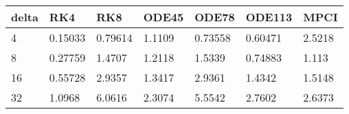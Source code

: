 \begin{tabular}{lllllll}
delta & RK4 & RK8 & ODE45 & ODE78 & ODE113 & MPCI \\ 
\hline 
4 & 0.15033 & 0.79614 & 1.1109 & 0.73558 & 0.60471 & 2.5218 \\ 
8 & 0.27759 & 1.4707 & 1.2118 & 1.5339 & 0.74883 & 1.113 \\ 
16 & 0.55728 & 2.9357 & 1.3417 & 2.9361 & 1.4342 & 1.5148 \\ 
32 & 1.0968 & 6.0616 & 2.3074 & 5.5542 & 2.7602 & 2.6373 \\ 
\hline 
\end{tabular}